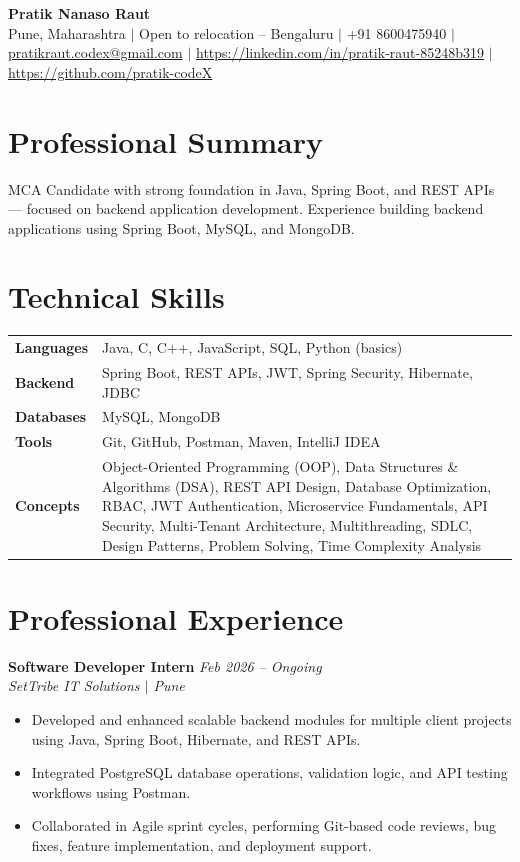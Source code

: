 \documentclass[10.5pt,a4paper]{article}
\begin{document}
\begin{center}
{\Large\bfseries Pratik Nanaso Raut}\\[2pt]
Pune, Maharashtra $|$ Open to relocation -- Bengaluru $|$ +91 8600475940 $|$ \href{mailto:pratikraut.codex@gmail.com}{pratikraut.codex@gmail.com} $|$ \href{https://linkedin.com/in/pratik-raut-85248b319}{https://linkedin.com/in/pratik-raut-85248b319} $|$ \href{https://github.com/pratik-codeX}{https://github.com/pratik-codeX}
\end{center}
\vspace{-2pt}
\section{Professional Summary}
MCA Candidate with strong foundation in Java, Spring Boot, and REST APIs — focused on backend application development. Experience building backend applications using Spring Boot, MySQL, and MongoDB.
\section{Technical Skills}
\begin{tabular}{@{}p{}p{}@{}}
\textbf{Languages} & Java, C, C++, JavaScript, SQL, Python (basics) \\[1pt]
\textbf{Backend} & Spring Boot, REST APIs, JWT, Spring Security, Hibernate, JDBC \\[1pt]
\textbf{Databases} & MySQL, MongoDB \\[1pt]
\textbf{Tools} & Git, GitHub, Postman, Maven, IntelliJ IDEA \\[1pt]
\textbf{Concepts} & Object-Oriented Programming (OOP), Data Structures \& Algorithms (DSA), REST API Design, Database Optimization, RBAC, JWT Authentication, Microservice Fundamentals, API Security, Multi-Tenant Architecture, Multithreading, SDLC, Design Patterns, Problem Solving, Time Complexity Analysis \\
\end{tabular}
\section{Professional Experience}
\textbf{Software Developer Intern} \hfill \textit{Feb 2026 -- Ongoing}
\\\textit{SetTribe IT Solutions $|$ Pune}
\begin{itemize}
  \item Developed and enhanced scalable backend modules for multiple client projects using Java, Spring Boot, Hibernate, and REST APIs.
  \item Integrated PostgreSQL database operations, validation logic, and API testing workflows using Postman.
  \item Collaborated in Agile sprint cycles, performing Git-based code reviews, bug fixes, feature implementation, and deployment support.
\end{itemize}
\end{document}
